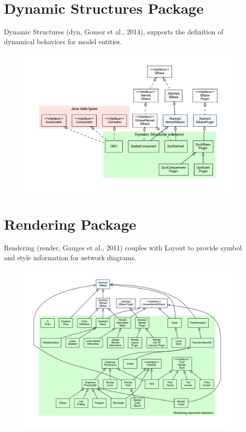 \section{Dynamic Structures Package}
\label{sec:dyn-overview}
Dynamic Structures (dyn, Gomez et al., 2014), supports the definition
of dynamical behaviors for model entities.

\begin{figure}[hb]
 \centering
 \vspace*{2ex}
 \includegraphics[width=\textwidth]{../../../extensions/dyn/doc/img/type_hierarchy.pdf}
 \caption[The dynamic structures extension]{}
 \label{fig:dyn}
\end{figure}


\section{Rendering Package}
\label{sec:render-overview}
Rendering (render, Gauges et al., 2011) couples with Layout to provide 
symbol and style information for network diagrams.

\begin{figure}[hb]
 \centering
 \vspace*{2ex}
 \includegraphics[width=\textwidth]{../../../extensions/render/doc/img/type_hierarchy.pdf}
 \caption[The rendering extension]{}
 \label{fig:render}
\end{figure}
